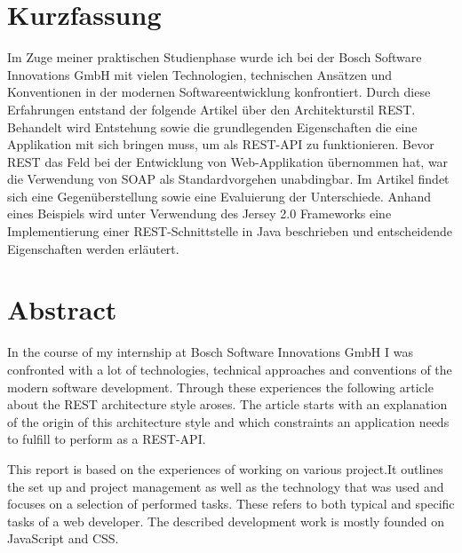 \pagestyle{empty} %

\section*{Kurzfassung}
\label{cha:kurzfassung}
Im Zuge meiner praktischen Studienphase wurde ich bei der Bosch Software Innovations GmbH mit vielen Technologien, technischen Ansätzen und Konventionen in der modernen Softwareentwicklung konfrontiert. Durch diese Erfahrungen entstand der folgende Artikel über den Architekturstil REST. Behandelt wird Entstehung sowie die grundlegenden Eigenschaften die eine Applikation mit sich bringen muss, um als REST-API zu funktionieren. Bevor REST das Feld bei der Entwicklung von Web-Applikation übernommen hat, war die Verwendung von SOAP als Standardvorgehen unabdingbar. Im Artikel findet sich eine Gegenüberstellung sowie eine Evaluierung der Unterschiede. Anhand eines Beispiels wird unter Verwendung des Jersey 2.0 Frameworks eine Implementierung einer REST-Schnittstelle in Java beschrieben und entscheidende Eigenschaften werden erläutert.

\vspace{5em}
\renewcommand{\cleardoublepage}{}
\renewcommand{\clearpage}{}
\section*{Abstract}\label{cha:abtract}
In the course of my internship at Bosch Software Innovations GmbH I was confronted with a lot of technologies, technical approaches and conventions of the modern software development. Through these experiences the following article about the REST architecture style aroses. The article starts with an explanation of the origin of this architecture style and which constraints an application needs to fulfill to  perform as a REST-API. 

This report is based on the experiences of working on various project.It outlines the set up and project management as well as the technology that was used and focuses on a selection of performed tasks. These refers to both typical and specific tasks of a web developer. The described development work is mostly founded on JavaScript and CSS.
\vspace{5em}

